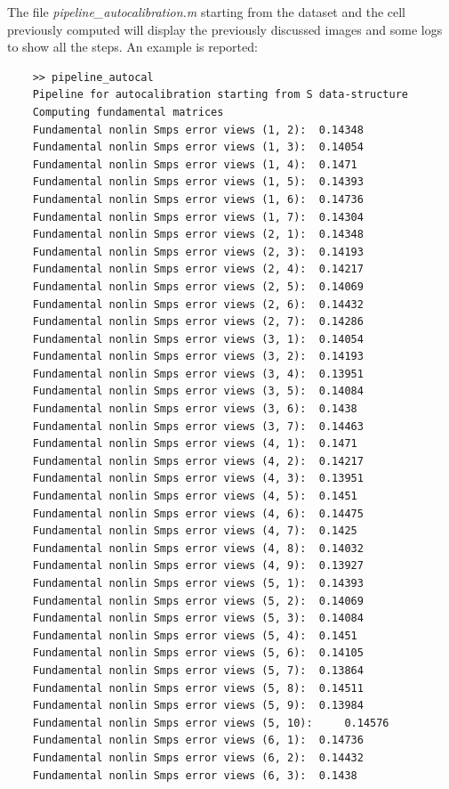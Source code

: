 \documentclass[11pt]{article}
\begin{document}
\bigskip
\noindent The file \textit{pipeline\_autocalibration.m} starting from the dataset and the cell previously computed will display the previously discussed images and some logs to show all the steps. An example is reported:
\begin{verbatim}
    >> pipeline_autocal
    Pipeline for autocalibration starting from S data-structure
    Computing fundamental matrices
    Fundamental nonlin Smps error views (1, 2):	 0.14348 
    Fundamental nonlin Smps error views (1, 3):	 0.14054 
    Fundamental nonlin Smps error views (1, 4):	 0.1471 
    Fundamental nonlin Smps error views (1, 5):	 0.14393 
    Fundamental nonlin Smps error views (1, 6):	 0.14736 
    Fundamental nonlin Smps error views (1, 7):	 0.14304 
    Fundamental nonlin Smps error views (2, 1):	 0.14348 
    Fundamental nonlin Smps error views (2, 3):	 0.14193 
    Fundamental nonlin Smps error views (2, 4):	 0.14217 
    Fundamental nonlin Smps error views (2, 5):	 0.14069 
    Fundamental nonlin Smps error views (2, 6):	 0.14432 
    Fundamental nonlin Smps error views (2, 7):	 0.14286 
    Fundamental nonlin Smps error views (3, 1):	 0.14054 
    Fundamental nonlin Smps error views (3, 2):	 0.14193 
    Fundamental nonlin Smps error views (3, 4):	 0.13951 
    Fundamental nonlin Smps error views (3, 5):	 0.14084 
    Fundamental nonlin Smps error views (3, 6):	 0.1438 
    Fundamental nonlin Smps error views (3, 7):	 0.14463 
    Fundamental nonlin Smps error views (4, 1):	 0.1471 
    Fundamental nonlin Smps error views (4, 2):	 0.14217 
    Fundamental nonlin Smps error views (4, 3):	 0.13951 
    Fundamental nonlin Smps error views (4, 5):	 0.1451 
    Fundamental nonlin Smps error views (4, 6):	 0.14475 
    Fundamental nonlin Smps error views (4, 7):	 0.1425 
    Fundamental nonlin Smps error views (4, 8):	 0.14032 
    Fundamental nonlin Smps error views (4, 9):	 0.13927 
    Fundamental nonlin Smps error views (5, 1):	 0.14393 
    Fundamental nonlin Smps error views (5, 2):	 0.14069 
    Fundamental nonlin Smps error views (5, 3):	 0.14084 
    Fundamental nonlin Smps error views (5, 4):	 0.1451 
    Fundamental nonlin Smps error views (5, 6):	 0.14105 
    Fundamental nonlin Smps error views (5, 7):	 0.13864 
    Fundamental nonlin Smps error views (5, 8):	 0.14511 
    Fundamental nonlin Smps error views (5, 9):	 0.13984 
    Fundamental nonlin Smps error views (5, 10):	 0.14576 
    Fundamental nonlin Smps error views (6, 1):	 0.14736 
    Fundamental nonlin Smps error views (6, 2):	 0.14432 
    Fundamental nonlin Smps error views (6, 3):	 0.1438 

\end{verbatim}
\end{document}
